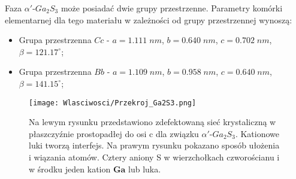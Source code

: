 Faza $\alpha'$-$Ga_{2}S_{3}$ może posiadać dwie grupy przestrzenne. Parametry komórki elementarnej dla tego materiału w zależności od grupy przestrzennej wynoszą:
\begin{itemize}
	\item Grupa przestrzenna $Cc$ - $a=1.111\;nm$, $b=0.640\;nm$, $c=0.702\;nm$, $\beta=121.17^{\circ}$;
	\item Grupa przestrzenna $Bb$ -  $a=1.109\;nm$, $b=0.958\;nm$, $c=0.640\;nm$, $\beta=141.15^{\circ}$;
\end{itemize}

\begin{figure}[H]
	\begin{center}
		\texttt{[image: Wlasciwosci/Przekroj\_Ga2S3.png]}
		\caption{Na lewym rysunku przedstawiono zdefektowaną sieć krystaliczną w płaszczyźnie prostopadłej do osi c dla związku $\alpha'$-$Ga_{2}S_{3}$. Kationowe luki tworzą interfejs. Na prawym rysunku pokazano sposób ułożenia i wiązania atomów. Cztery aniony S w wierzchołkach czworościanu i w środku jeden kation $\mathbf{Ga}$ lub luka.}
	\end{center}
\end{figure}

